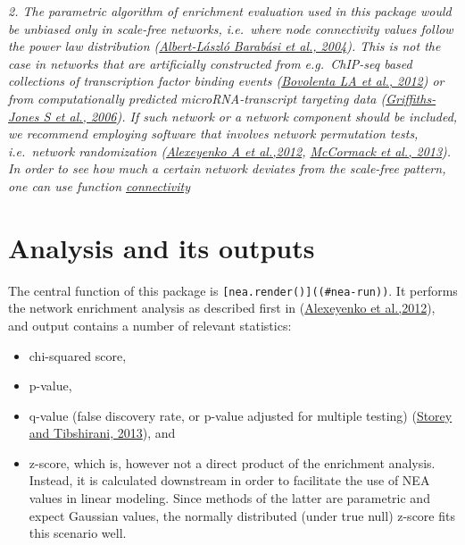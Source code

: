 \documentclass[]{article}
\providecommand{\tightlist}{%
  \setlength{\itemsep}{0pt}\setlength{\parskip}{0pt}}
\begin{document}
\emph{2. The parametric algorithm of enrichment evaluation used in this
package would be unbiased only in scale-free networks, i.e.~where node
connectivity values follow the power law distribution
(\href{http://www.nature.com/nrg/journal/v5/n2/full/nrg1272.html}{Albert-László
Barabási et al., 2004}). This is not the case in networks that are
artificially constructed from e.g.~ChIP-seq based collections of
transcription factor binding events
(\href{http://www.ncbi.nlm.nih.gov/pubmed/22900683}{Bovolenta LA et al.,
2012}) or from computationally predicted microRNA-transcript targeting
data (\href{http://www.ncbi.nlm.nih.gov/pubmed/16381832}{Griffiths-Jones
S et al., 2006}). If such network or a network component should be
included, we recommend employing software that involves network
permutation tests, i.e.~network randomization
(\href{http://www.ncbi.nlm.nih.gov/pubmed/22966941}{Alexeyenko A et
al.,2012}, \href{http://www.ncbi.nlm.nih.gov/pubmed/23372799}{McCormack
et al., 2013}). In order to see how much a certain network deviates from
the scale-free pattern, one can use function
\protect\hyperlink{connect}{connectivity}}

\section{Analysis and its outputs}\label{test5}

The central function of this package is
\texttt{{[}nea.render(){]}((\#nea-run))}. It performs the network
enrichment analysis as described first in
(\href{http://www.ncbi.nlm.nih.gov/pubmed/22966941}{Alexeyenko et
al.,2012}), and output contains a number of relevant statistics:

\begin{itemize}
\tightlist
\item
  chi-squared score,
\item
  p-value,
\item
  q-value (false discovery rate, or p-value adjusted for multiple
  testing) (\href{http://www.ncbi.nlm.nih.gov/pubmed/12883005}{Storey
  and Tibshirani, 2013}), and
\item
  z-score, which is, however not a direct product of the enrichment
  analysis. Instead, it is calculated downstream in order to facilitate
  the use of NEA values in linear modeling. Since methods of the latter
  are parametric and expect Gaussian values, the normally distributed
  (under true null) z-score fits this scenario well.
\end{itemize}
\end{document}
